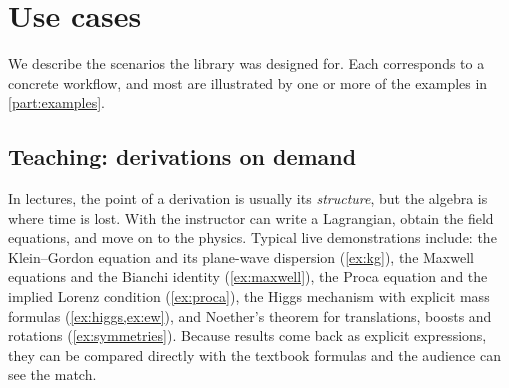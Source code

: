 \section{Use cases}
\label{sec:usecases}

We describe the scenarios the library was designed for. Each corresponds to a concrete workflow, and most are illustrated by one or more of the examples in \cref{part:examples}.

\subsection{Teaching: derivations on demand}

In lectures, the point of a derivation is usually its \emph{structure}, but the algebra is where time is lost. With \fs{} the instructor can write a Lagrangian, obtain the field equations, and move on to the physics. Typical live demonstrations include: the Klein--Gordon equation and its plane-wave dispersion (\cref{ex:kg}), the Maxwell equations and the Bianchi identity (\cref{ex:maxwell}), the Proca equation and the implied Lorenz condition (\cref{ex:proca}), the Higgs mechanism with explicit mass formulas (\cref{ex:higgs,ex:ew}), and Noether's theorem for translations, boosts and rotations (\cref{ex:symmetries}). Because results come back as explicit expressions, they can be compared directly with the textbook formulas and the audience can see the match.

